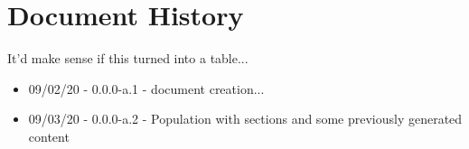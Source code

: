\chapter*{Document History}
It'd make sense if this turned into a table...

\begin{itemize}
\item 09/02/20 -  0.0.0-a.1 - document creation...
\item 09/03/20 -  0.0.0-a.2 - Population with sections and some previously generated content
\end{itemize}